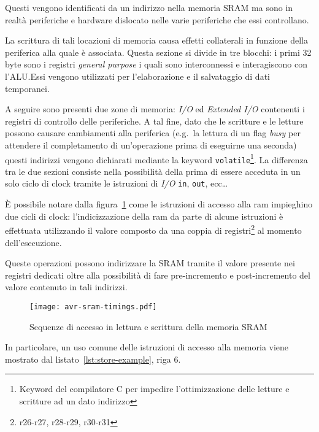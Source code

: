 Questi vengono identificati da un indirizzo nella memoria SRAM ma sono in realtà periferiche e hardware dislocato nelle varie periferiche che essi controllano.

La scrittura di tali locazioni di memoria causa effetti collaterali in funzione della periferica alla quale è associata. Questa sezione si divide in tre blocchi: i primi 32 byte sono i registri \textit{general purpose} i quali sono interconnessi e interagiscono con l'ALU.\@ Essi vengono utilizzati per l'elaborazione e il salvataggio di dati temporanei.

A seguire sono presenti due zone di memoria: \textit{I/O} ed \textit{Extended I/O} contenenti i registri di controllo delle periferiche. A tal fine, dato che le scritture e le letture possono causare cambiamenti alla periferica (e.g.\ la lettura di un flag \textit{busy} per attendere il completamento di un'operazione prima di eseguirne una seconda) questi indirizzi vengono dichiarati mediante la keyword \texttt{volatile}\footnote{Keyword del compilatore C per impedire l'ottimizzazione delle letture e scritture ad un dato indirizzo}. La differenza tra le due sezioni consiste nella possibilità della prima di essere acceduta in un solo ciclo di clock tramite le istruzioni di \textit{I/O} \texttt{in}, \texttt{out}, ecc\ldots

È possibile notare dalla figura~\ref{fig:avr-sram-timings} come le istruzioni di accesso alla ram impieghino due cicli di clock: l'indicizzazione della ram da parte di alcune istruzioni è effettuata utilizzando il valore composto da una coppia di registri\footnote{r26-r27, r28-r29, r30-r31} al momento dell'esecuzione. 

Queste operazioni possono indirizzare la SRAM tramite il valore presente nei registri dedicati oltre alla possibilità di fare pre-incremento e post-incremento del valore contenuto in tali indirizzi.

\begin{figure}[b]
    \centering
    \texttt{[image: avr-sram-timings.pdf]}
    \caption[Immagine rielaborata a partire dalla fig. 8-4 del documento~\cite{avr:m328p}]{Sequenze di accesso in lettura e scrittura della memoria SRAM\cite[fig 8-4]{avr:m328p}}\label{fig:avr-sram-timings}
\end{figure}

In particolare, un uso comune delle istruzioni di accesso alla memoria viene mostrato dal listato~\ref{lst:store-example}, riga 6.


